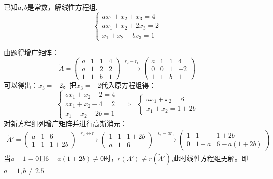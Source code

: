 \documentclass[a4paper]{report}
\begin{document}
\EX 已知$a,b$是常数，解线性方程组.
\begin{equation*}
\begin{cases}
ax_1+x_2+x_3=4\\
ax_1+x_2+2x_3=2\\
x_1+x_2+bx_3=1
\end{cases}
\end{equation*}

\begin{jie}
由题得增广矩阵：
\begin{equation*}
\widetilde{A}=
\begin{pmatrix}
a&1&1&4\\
a&1&2&2\\
1&1&b&1
\end{pmatrix}\xrightarrow{\substack{r_2-r_1}}
{
\begin{pmatrix}
a&1&1&4\\
0&0&1&-2\\
1&1&b&1
\end{pmatrix}
}
\end{equation*}
可以得出：$x_3=-2$。把$x_3=-2$代入原方程组得：
\begin{equation*}
\begin{cases}
ax_1+x_2-2=4\\
ax_1+x_2-4=2\\
x_1+x_2-2b=1
\end{cases}~~~\Rightarrow~~~
\begin{cases}
ax_1+x_2=6\\
x_1+x_2=1+2b
\end{cases}
\end{equation*}
对新方程组列增广矩阵并进行高斯消元：
\begin{align*}
\widetilde{A}'=
\begin{pmatrix}
a&1&6\\
1&1&1+2b
\end{pmatrix}\xrightarrow{\substack{r_2\leftrightarrow r_1}}
{
\begin{pmatrix}
1&1&1+2b\\
a&1&6
\end{pmatrix}
}\xrightarrow{\substack{r_2-a r_1}}
{
\begin{pmatrix}
1&1&1+2b\\
0&1-a&6-a(1+2b)
\end{pmatrix}
}
\end{align*}
当$a-1=0$且$6-a(1+2b)\neq 0$时，$r(A')\neq r(\widetilde{A}')$,此时线性方程组无解。即$a=1,b\neq 2.5$.


\end{jie}
\end{document}
